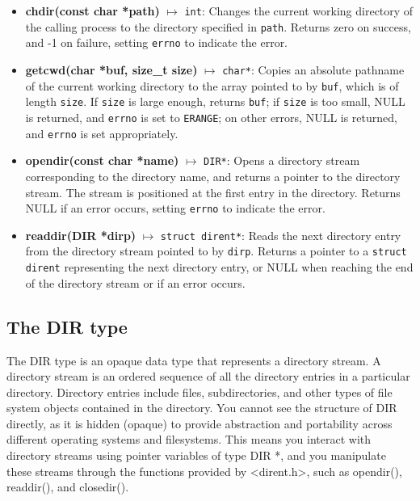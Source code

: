 \documentclass{report}
\begin{document}
    \pagebreak 
    \begin{itemize}
        \item \textbf{chdir(const char *path)} $\mapsto$ \texttt{int}: Changes the current working directory of the calling process to the directory specified in \texttt{path}. Returns zero on success, and -1 on failure, setting \texttt{errno} to indicate the error.
        \item \textbf{getcwd(char *buf, size\_t size)} $\mapsto$ \texttt{char*}: Copies an absolute pathname of the current working directory to the array pointed to by \texttt{buf}, which is of length \texttt{size}. If \texttt{size} is large enough, returns \texttt{buf}; if \texttt{size} is too small, NULL is returned, and \texttt{errno} is set to \texttt{ERANGE}; on other errors, NULL is returned, and \texttt{errno} is set appropriately.
        \item \textbf{opendir(const char *name)} $\mapsto$ \texttt{DIR*}: Opens a directory stream corresponding to the directory name, and returns a pointer to the directory stream. The stream is positioned at the first entry in the directory. Returns NULL if an error occurs, setting \texttt{errno} to indicate the error.
        \item \textbf{readdir(DIR *dirp)} $\mapsto$ \texttt{struct dirent*}: Reads the next directory entry from the directory stream pointed to by \texttt{dirp}. Returns a pointer to a \texttt{struct dirent} representing the next directory entry, or NULL when reaching the end of the directory stream or if an error occurs.
    \end{itemize}
    \bigbreak \noindent 
    \subsection{The DIR type}
    \bigbreak \noindent 
    The DIR type is an opaque data type that represents a directory stream. A directory stream is an ordered sequence of all the directory entries in a particular directory. Directory entries include files, subdirectories, and other types of file system objects contained in the directory.
    \bigbreak \noindent 
    You cannot see the structure of DIR directly, as it is hidden (opaque) to provide abstraction and portability across different operating systems and filesystems. This means you interact with directory streams using pointer variables of type DIR *, and you manipulate these streams through the functions provided by <dirent.h>, such as opendir(), readdir(), and closedir().
    \bigbreak \noindent 
\end{document}
